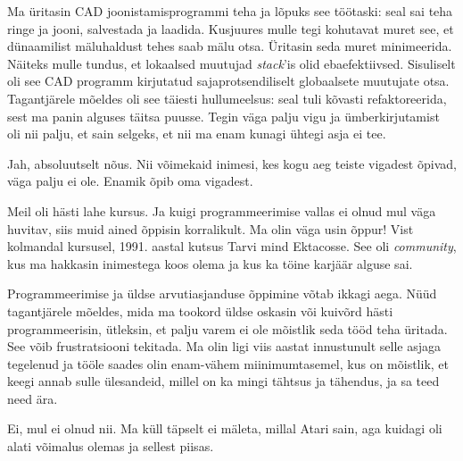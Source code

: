 Ma üritasin CAD joonistamisprogrammi teha ja lõpuks see
töötaski: seal sai teha ringe ja jooni, salvestada ja 
laadida. Kusjuures mulle tegi kohutavat muret see, et dünaamilist mäluhaldust tehes saab mälu otsa. Üritasin seda muret minimeerida. 
Näiteks mulle tundus, et lokaalsed muutujad \emph{stack}'is olid 
ebaefektiivsed. Sisuliselt oli see CAD programm kirjutatud 
sajaprotsendiliselt globaalsete muutujate otsa. Tagantjärele mõeldes oli see täiesti hullumeelsus: seal tuli kõvasti refaktoreerida, sest ma panin 
alguses täitsa puusse. Tegin väga palju vigu ja ümberkirjutamist oli nii palju, et 
sain selgeks, et nii ma enam kunagi ühtegi asja ei tee.


Jah, absoluutselt nõus. Nii võimekaid inimesi, kes kogu aeg teiste 
vigadest õpivad, väga palju ei ole. Enamik õpib oma vigadest. 


Meil oli hästi lahe kursus. Ja kuigi programmeerimise vallas ei 
olnud mul väga huvitav, siis muid ained õppisin korralikult. Ma olin väga usin õppur! Vist kolmandal kursusel, 1991. aastal kutsus 
Tarvi mind Ektacosse. See oli 
\emph{community}, kus ma hakkasin inimestega koos olema ja kus 
ka töine karjäär alguse sai.


Programmeerimise ja üldse arvutiasjanduse 
õppimine võtab ikkagi aega. Nüüd tagantjärele mõeldes, mida ma tookord 
üldse oskasin või kuivõrd hästi programmeerisin, ütleksin, et palju varem ei ole mõistlik seda tööd teha üritada. See võib  
frustratsiooni tekitada. Ma olin ligi viis aastat innustunult 
selle asjaga tegelenud ja tööle saades olin enam-vähem miinimumtasemel, kus on mõistlik, et keegi annab sulle 
ülesandeid, millel on ka mingi tähtsus ja tähendus, ja sa teed need ära.


Ei, mul ei olnud nii. Ma küll täpselt ei mäleta, millal 
Atari sain, aga kuidagi oli alati võimalus olemas ja sellest piisas. 


